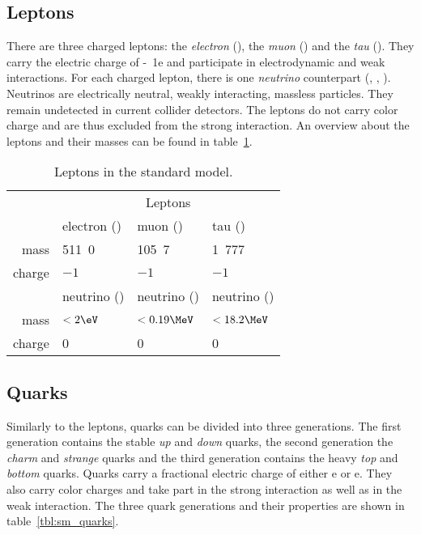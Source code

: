 \subsection{Leptons}
There are three charged leptons: the \emph{electron} (\Pe), the \emph{muon} (\Pmu) and the \emph{tau} (\Ptau). They carry the electric charge of \unit{-1}{e} and participate in electrodynamic and weak interactions. For each charged lepton, there is one \emph{neutrino} counterpart (\Pnue, \Pnum, \Pnut). Neutrinos are electrically neutral, weakly interacting, massless particles. They remain undetected in current collider detectors.
The leptons do not carry color charge and are thus excluded from the strong interaction.
An overview about the leptons and their masses can be found in table~\ref{tbl:sm_leptons}.

\begin{table}[htbp]
	\centering
	\begin{tabular}{ r | l | l | l | }
		\cline{2-4}
		& \multicolumn{3}{c|}{Leptons} \\ \cline{2-4}
		& electron (\Pe) & muon (\Pmu) & tau (\Ptau) \\ %
		mass & \unit{511.0}{\keV} & \unit{105.7}{\MeV} & \unit{1.777}{\GeV} \\ %
		charge & $-1$ & $-1$ & $-1$ \\ \cline{2-4}
		& \Pe neutrino (\Pnue) & \Pmu neutrino (\Pnum) & \Ptau neutrino (\Pnut) \\ %
		mass & $< \unit{2}{\eV}$ & $< \unit{0.19}{\MeV}$ & $< \unit{18.2}{\MeV}$ \\ %
		charge & 0 & 0 & 0 \\ \cline{2-4}
	\end{tabular}
	\caption{Leptons in the standard model\cite[p.~30, p.~690f.]{Oo2014Review}.}
	\label{tbl:sm_leptons}
\end{table}

\subsection{Quarks}
Similarly to the leptons, quarks can be divided into three generations. The first generation contains the stable \emph{up} and \emph{down} quarks, the second generation the \emph{charm} and \emph{strange} quarks and the third generation contains the heavy \emph{top} and \emph{bottom} quarks. Quarks carry a fractional electric charge of either \unit{}{e} or \unit{}{e}.
They also carry color charges and take part in the strong interaction as well as in the weak interaction.
The three quark generations and their properties are shown in table~\ref{tbl:sm_quarks}.

